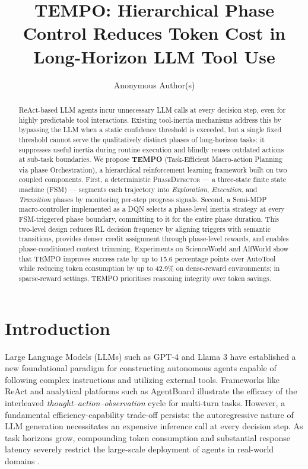 \documentclass[runningheads]{llncs}
\title{TEMPO: Hierarchical Phase Control Reduces Token Cost in Long-Horizon LLM Tool Use}
\author{Anonymous Author(s)}
\institute{Paper under Double-Blind Review}
\begin{document}
\maketitle
\begin{abstract}
ReAct-based LLM agents incur unnecessary LLM calls at every decision step, even for highly predictable tool interactions. Existing tool-inertia mechanisms address this by bypassing the LLM when a static confidence threshold is exceeded, but a single fixed threshold cannot serve the qualitatively distinct phases of long-horizon tasks: it suppresses useful inertia during routine execution and blindly reuses outdated actions at sub-task boundaries. We propose \textbf{TEMPO} (Task-Efficient Macro-action Planning via phase Orchestration), a hierarchical reinforcement learning framework built on two coupled components. First, a deterministic \textsc{PhaseDetector} — a three-state finite state machine (FSM) — segments each trajectory into \emph{Exploration}, \emph{Execution}, and \emph{Transition} phases by monitoring per-step progress signals. Second, a Semi-MDP macro-controller implemented as a DQN selects a phase-level inertia strategy at every FSM-triggered phase boundary, committing to it for the entire phase duration. This two-level design reduces RL decision frequency by aligning triggers with semantic transitions, provides denser credit assignment through phase-level rewards, and enables phase-conditioned context trimming. Experiments on ScienceWorld and AlfWorld show that TEMPO improves success rate by up to 15.6 percentage points over AutoTool while reducing token consumption by up to 42.9\% on dense-reward environments; in sparse-reward settings, TEMPO prioritises reasoning integrity over token savings.


\end{abstract}

\section{Introduction}
Large Language Models (LLMs) such as GPT-4 \cite{gpt4} and Llama 3 \cite{llama3} have established a new foundational paradigm for constructing autonomous agents capable of following complex instructions and utilizing external tools. Frameworks like ReAct \cite{react} and analytical platforms such as AgentBoard \cite{agentboard} illustrate the efficacy of the interleaved \emph{thought--action--observation} cycle for multi-turn tasks. However, a fundamental efficiency-capability trade-off persists: the autoregressive nature of LLM generation necessitates an expensive inference call at every decision step. As task horizons grow, compounding token consumption and substantial response latency severely restrict the large-scale deployment of agents in real-world domains \cite{deepseekr1,bot}.
\end{document}

